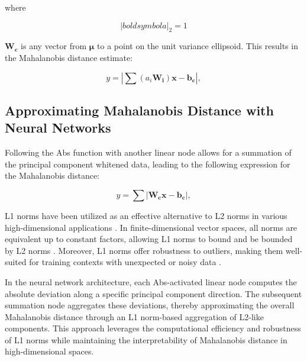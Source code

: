 where

\begin{equation}
    \label{eq:pc_mixture_constraint}
    \left| boldsymbol{a} \right|_2 = 1
\end{equation}

$\boldsymbol{W_c}$ is any vector from $\boldsymbol{\mu}$ to a point on the unit variance ellipsoid. This results in the Mahalanobis distance estimate:

\begin{equation}
    \label{eq:mahalanobis_mixed}
    y = \left| \sum (a_i \mathbf{W_i}) \mathbf{x} - \mathbf{b_c} \right|,
\end{equation}

\subsection{Approximating Mahalanobis Distance with Neural Networks}

Following the Abs function with another linear node allows for a summation of the principal component whitened data, leading to the following expression for the Mahalanobis distance:

\begin{equation}
    \label{eq:mahalanobis_L1}
    y = \sum \left| \mathbf{W_c} \mathbf{x} - \mathbf{b_c} \right|,
\end{equation}

L1 norms have been utilized as an effective alternative to L2 norms in various high-dimensional applications \citep{bernhardsson2018annoy}. In finite-dimensional vector spaces, all norms are equivalent up to constant factors, allowing L1 norms to bound and be bounded by L2 norms \citep{kreyszig1978introductory}. Moreover, L1 norms offer robustness to outliers, making them well-suited for training contexts with unexpected or noisy data \citep{candes2005decoding}. 

In the neural network architecture, each Abs-activated linear node computes the absolute deviation along a specific principal component direction. The subsequent summation node aggregates these deviations, thereby approximating the overall Mahalanobis distance through an L1 norm-based aggregation of L2-like components. This approach leverages the computational efficiency and robustness of L1 norms while maintaining the interpretability of Mahalanobis distance in high-dimensional spaces.
